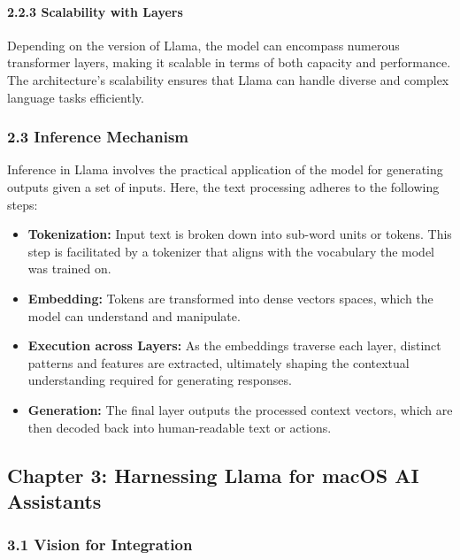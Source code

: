 \hypertarget{scalability-with-layers}{%
\paragraph{2.2.3 Scalability with
Layers}\label{scalability-with-layers}}

Depending on the version of Llama, the model can encompass numerous
transformer layers, making it scalable in terms of both capacity and
performance. The architecture's scalability ensures that Llama can
handle diverse and complex language tasks efficiently.

\hypertarget{inference-mechanism}{%
\subsubsection{2.3 Inference Mechanism}\label{inference-mechanism}}

Inference in Llama involves the practical application of the model for
generating outputs given a set of inputs. Here, the text processing
adheres to the following steps:

\begin{itemize}
\tightlist
\item
  \textbf{Tokenization:} Input text is broken down into sub-word units
  or tokens. This step is facilitated by a tokenizer that aligns with
  the vocabulary the model was trained on.
\item
  \textbf{Embedding:} Tokens are transformed into dense vectors spaces,
  which the model can understand and manipulate.
\item
  \textbf{Execution across Layers:} As the embeddings traverse each
  layer, distinct patterns and features are extracted, ultimately
  shaping the contextual understanding required for generating
  responses.
\item
  \textbf{Generation:} The final layer outputs the processed context
  vectors, which are then decoded back into human-readable text or
  actions.
\end{itemize}

\hypertarget{chapter-3-harnessing-llama-for-macos-ai-assistants}{%
\subsection{Chapter 3: Harnessing Llama for macOS AI
Assistants}\label{chapter-3-harnessing-llama-for-macos-ai-assistants}}

\hypertarget{vision-for-integration}{%
\subsubsection{3.1 Vision for
Integration}\label{vision-for-integration}}

